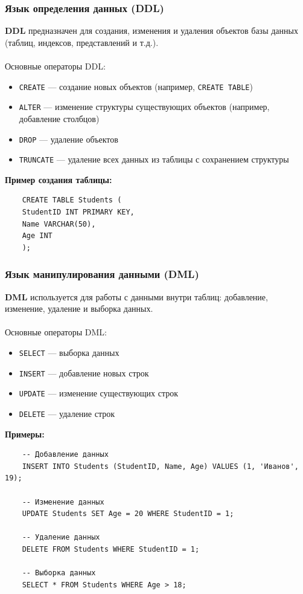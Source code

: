 \documentclass[a4paper, 12pt]{report}
\numberwithin{equation}{section}
\begin{document}
\subsubsection*{Язык определения данных (DDL)}
\textbf{DDL} предназначен для создания, изменения и удаления объектов базы данных (таблиц, индексов, представлений и т.д.).
\\\\
Основные операторы DDL:
\begin{itemize}
	\item \texttt{CREATE} --- создание новых объектов (например, \texttt{CREATE TABLE})
	\item \texttt{ALTER} --- изменение структуры существующих объектов (например, добавление столбцов)
	\item \texttt{DROP} --- удаление объектов
	\item \texttt{TRUNCATE} --- удаление всех данных из таблицы с сохранением структуры
\end{itemize}
\textbf{Пример создания таблицы:}
\begin{verbatim}
	CREATE TABLE Students (
	StudentID INT PRIMARY KEY,
	Name VARCHAR(50),
	Age INT
	);
\end{verbatim}
\subsubsection*{Язык манипулирования данными (DML)}
\textbf{DML} используется для работы с данными внутри таблиц: добавление, изменение, удаление и выборка данных.
\\\\
Основные операторы DML:
\begin{itemize}
	\item \texttt{SELECT} --- выборка данных
	\item \texttt{INSERT} --- добавление новых строк
	\item \texttt{UPDATE} --- изменение существующих строк
	\item \texttt{DELETE} --- удаление строк
\end{itemize}
\textbf{Примеры:}
\begin{verbatim}
	-- Добавление данных
	INSERT INTO Students (StudentID, Name, Age) VALUES (1, 'Иванов', 19);
	
	-- Изменение данных
	UPDATE Students SET Age = 20 WHERE StudentID = 1;
	
	-- Удаление данных
	DELETE FROM Students WHERE StudentID = 1;
	
	-- Выборка данных
	SELECT * FROM Students WHERE Age > 18;
\end{verbatim}
\end{document}
